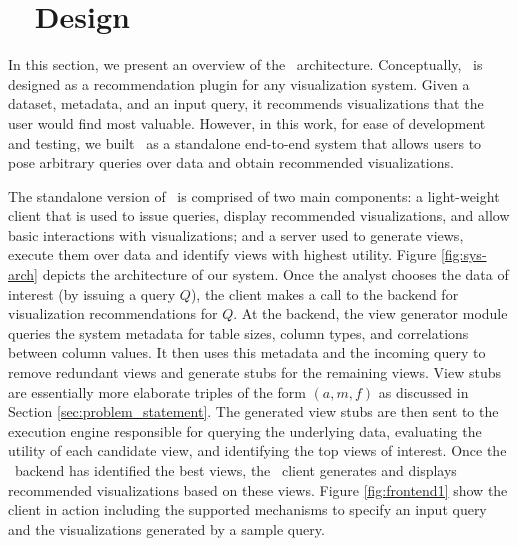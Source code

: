 

\section{{\large \SeeDB\ } Design}
\label{sec:system_architecture}

In this section, we present an overview of the \SeeDB\ architecture.
Conceptually, \SeeDB\ is designed as a recommendation plugin for any 
visualization system. Given a dataset, metadata, and an input query, 
it recommends visualizations that the user would find most valuable.
However, in this work, for ease of development and testing, we built 
\SeeDB\ as a standalone end-to-end system that allows users to pose 
arbitrary queries over data and obtain recommended visualizations.

The standalone version of \SeeDB\ is comprised of two main components: 
a light-weight client that is 
used to issue queries, display recommended visualizations, and allow basic 
interactions with visualizations; and a server used to generate views, execute
them over data and identify views with highest utility. 
Figure \ref{fig:sys-arch} depicts the architecture of our system.
Once the analyst chooses the data of interest (by issuing a query $Q$), the
client makes a call to the backend for visualization recommendations for $Q$.
At the backend, the view generator module queries the system metadata for table sizes, 
column types, and correlations between column values. 
It then uses this metadata and the incoming query to remove redundant views and generate stubs for the remaining views. 
View stubs are essentially more elaborate triples of the form $(a, m, f)$ as
discussed in Section \ref{sec:problem_statement}. 
The generated view stubs are then sent to the execution engine
responsible for querying the underlying data, evaluating the utility of each
candidate view, and identifying the top views of interest. 
Once the \SeeDB\ backend has identified the best views, the \SeeDB\
client generates and displays recommended visualizations based on these views.
Figure \ref{fig:frontend1} show the \SeeDB client in action including the supported mechanisms to specify an input query 
and the visualizations generated by a sample query. 


